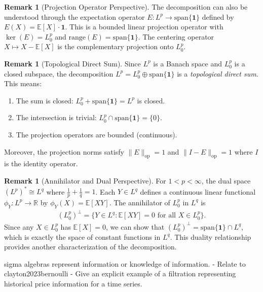 \documentclass[11pt,reqno]{amsart}
\theoremstyle{definition}
\newtheorem{remark}[theorem]{Remark}
\theoremstyle{remark}
\begin{document}
\begin{remark}[Projection Operator Perspective]
	The decomposition can also be understood through the expectation operator $E: L^p \to \text{span}\{\mathbf{1}\}$ defined by $E(X) = \mathbb{E}[X] \cdot \mathbf{1}$. This is a bounded linear projection operator with $\ker(E) = L^p_0$ and $\text{range}(E) = \text{span}\{\mathbf{1}\}$. The centering operator $X \mapsto X - \mathbb{E}[X]$ is the complementary projection onto $L^p_0$.
\end{remark}

\begin{remark}[Topological Direct Sum]
	Since $L^p$ is a Banach space and $L^p_0$ is a closed subspace, the decomposition $L^p = L^p_0 \oplus \text{span}\{\mathbf{1}\}$ is a \emph{topological direct sum}. This means:
	\begin{enumerate}[label=(\roman*)]
		\item The sum is closed: $L^p_0 + \text{span}\{\mathbf{1}\} = L^p$ is closed.
		\item The intersection is trivial: $L^p_0 \cap \text{span}\{\mathbf{1}\} = \{0\}$.
		\item The projection operators are bounded (continuous).
	\end{enumerate}
	Moreover, the projection norms satisfy $\|E\|_{\text{op}} = 1$ and $\|I - E\|_{\text{op}} = 1$ where $I$ is the identity operator.
\end{remark}

\begin{remark}[Annihilator and Dual Perspective]
	For $1 < p < \infty$, the dual space $(L^p)^* \cong L^q$ where $\frac{1}{p} + \frac{1}{q} = 1$. Each $Y \in L^q$ defines a continuous linear functional $\phi_Y: L^p \to \mathbb{R}$ by $\phi_Y(X) = \mathbb{E}[XY]$. The annihilator of $L^p_0$ in $L^q$ is
	\begin{align*}
		(L^p_0)^\perp = \{Y \in L^q : \mathbb{E}[XY] = 0 \text{ for all } X \in L^p_0\}.
	\end{align*}
	Since any $X \in L^p_0$ has $\mathbb{E}[X] = 0$, we can show that $(L^p_0)^\perp = \text{span}\{\mathbf{1}\} \cap L^q$, which is exactly the space of constant functions in $L^q$. This duality relationship provides another characterization of the decomposition.
\end{remark}


sigma algebras represent information or knowledge of information.
- Relate to clayton2023bernoulli
- Give an explicit example of a filtration representing historical price information for a time series.
\end{document}
